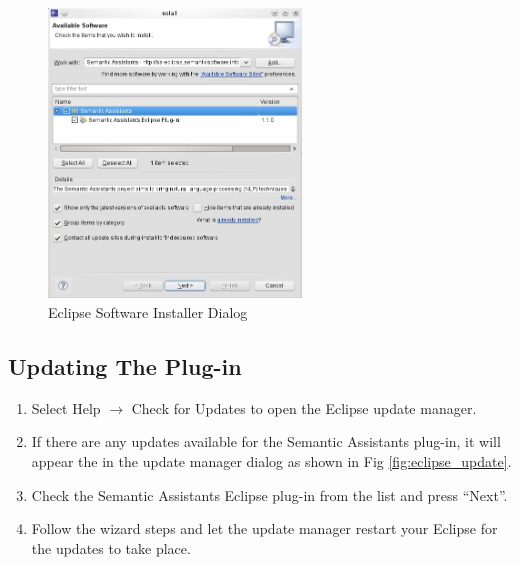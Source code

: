 \begin{figure}[htb]
\begin{center}
  \includegraphics[width=0.6\textwidth]{pictures/eclipse_install2.jpg}
  \caption{Eclipse Software Installer Dialog}
  \label{fig:eclipse_install2}
\end{center}
\end{figure}

\subsection{Updating The Plug-in}
\begin{enumerate}
  \item Select Help $\rightarrow$ Check for Updates to open the Eclipse update manager.
  \item If there are any updates available for the Semantic Assistants plug-in, it will appear the in the update manager dialog as shown in Fig \ref{fig:eclipse_update}.
  \item Check the Semantic Assistants Eclipse plug-in from the list and press ``Next''.
  \item Follow the wizard steps and let the update manager restart your Eclipse for the updates to take place.
\end{enumerate}


